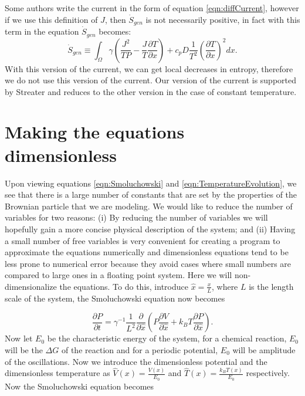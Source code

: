 Some authors write the current in the form of equation \ref{eqn:diffCurrent}, however if we use this definition of $J$, then $\dot{S}_{gen}$ is not necessarily positive, in fact with this term in the equation $\dot{S}_{gen}$ becomes:
\begin{equation}
\dot{S}_{gen} \equiv \int_{\Omega} \gamma \left(\frac{J^2}{T P} - \frac{J}{T} \frac{\partial T}{\partial x} \right) + c_p D \frac{1}{T^2} \left(\frac{\partial T}{\partial x} \right)^2 dx.
\end{equation}
With this version of the current, we can get local decreases in entropy, therefore we do not use this version of the current. Our version of the current is supported by Streater \cite{Streater1997, Streater1997a,Streater2000,Streater1997b} and reduces to the other version in the case of constant temperature.

\section{Making the equations dimensionless}  \label{dimensionless}

Upon viewing equations \ref{eqn:Smoluchowski} and \ref{eqn:TemperatureEvolution}, we see that there is a large number of constants that are set by the properties of the Brownian particle that we are modeling. We would like to reduce the number of variables for two reasons: (i) By reducing the number of variables we will hopefully gain a more concise physical description of the system; and (ii) Having a small number of free variables is very convenient for creating a program to approximate the equations numerically and dimensionless equations tend to be less prone to numerical error because they avoid cases where small numbers are compared to large ones in a floating point system.
Here we will non-dimensionalize the equations. To do this, introduce $\hat{x} = \frac{x}{L}$, where $L$ is the length scale of the system, the Smoluchowski equation now becomes

\begin{equation}
\frac{\partial P}{\partial t} = \gamma^{-1}\frac{1}{L^2} \frac{\partial}{\partial \hat{x}} \left (P \frac{\partial V}{\partial \hat{x}} + k_B T \frac{\partial P}{\partial \hat{x}} \right ).
\end{equation}
Now let $E_0$ be the characteristic energy of the system, for a chemical reaction, $E_0$ will be the $\Delta G$ of the reaction and for a periodic potential, $E_0$ will be amplitude of the oscillations. Now we introduce the dimensionless potential and the dimensionless temperature as $\hat{V}(x) = \frac{V(x)}{E_0}$ and $\hat{T}(x) = \frac{k_B T(x)}{E_0}$ respectively. Now the Smoluchowski equation becomes

